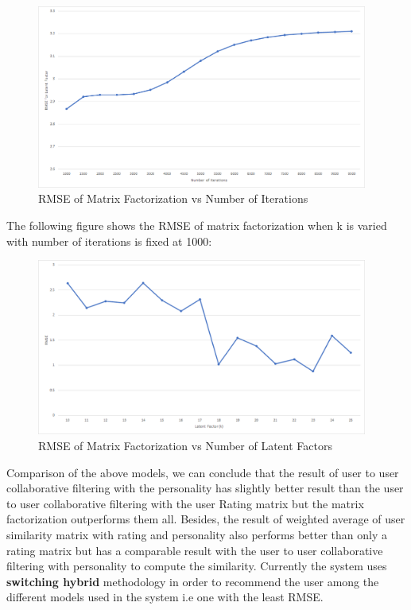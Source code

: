 \begin{figure}[!ht]
\centering
\includegraphics[width = 0.97\textwidth ]{fig/rmse_step.png}
\caption{RMSE of Matrix Factorization vs Number of Iterations}
\label{fig:rmse_step}
\end{figure}

The following figure shows the RMSE of matrix factorization when k is varied with number of iterations is fixed at 1000:
\begin{figure}[!ht]
\centering
\includegraphics[width = 0.97\textwidth ]{fig/rmse_k.png}
\caption{RMSE of Matrix Factorization vs Number of Latent Factors}
\label{fig:rmse_k}
\end{figure}

Comparison of the above models, we can conclude that the result of user to user collaborative filtering with the personality has slightly better result than the user to user collaborative filtering with the user Rating matrix but the matrix factorization outperforms them all. Besides, the result of weighted average of user similarity matrix with rating and personality also performs better than only a rating matrix but has a comparable result with the user to user collaborative filtering with personality to compute the similarity. Currently the system uses \textbf{switching hybrid} methodology in order to recommend the user among the different models used in the system i.e one with the least RMSE.
